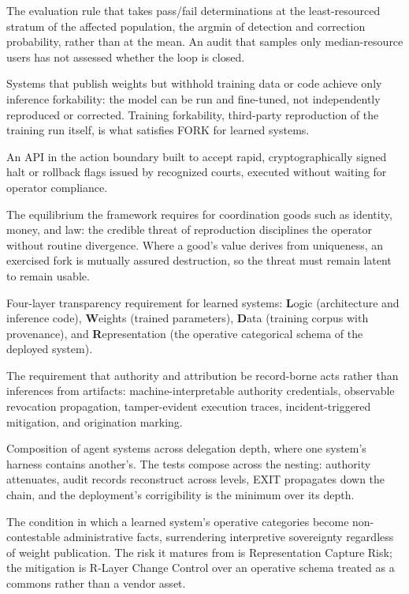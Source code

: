 \begin{description}[style=nextline, leftmargin=1.5em, font=\normalfont\bfseries]
The evaluation rule that takes pass/fail determinations at the
least-resourced stratum of the affected population, the argmin of
detection and correction probability, rather than at the mean. An audit
that samples only median-resource users has not assessed whether the
loop is closed.

Systems that publish weights but withhold training data or code
achieve only inference forkability: the model can be run and
fine-tuned, not independently reproduced or corrected. Training
forkability, third-party reproduction of the training run itself, is
what satisfies FORK for learned systems.

An API in the action boundary built to accept rapid, cryptographically
signed halt or rollback flags issued by recognized courts, executed
without waiting for operator compliance.

The equilibrium the framework requires for coordination goods such as
identity, money, and law: the credible threat of reproduction
disciplines the operator without routine divergence. Where a good's
value derives from uniqueness, an exercised fork is mutually assured
destruction, so the threat must remain latent to remain usable.

Four-layer transparency requirement for learned systems: \textbf{L}ogic
(architecture and inference code), \textbf{W}eights (trained
parameters), \textbf{D}ata (training corpus with provenance), and
\textbf{R}epresentation (the operative categorical schema of the
deployed system).

The requirement that authority and attribution be record-borne acts
rather than inferences from artifacts: machine-interpretable authority
credentials, observable revocation propagation, tamper-evident
execution traces, incident-triggered mitigation, and origination
marking.

Composition of agent systems across delegation depth, where one
system's harness contains another's. The tests compose across the
nesting: authority attenuates, audit records reconstruct across levels,
EXIT propagates down the chain, and the deployment's corrigibility is
the minimum over its depth.

The condition in which a learned system's operative categories become
non-contestable administrative facts, surrendering interpretive
sovereignty regardless of weight publication. The risk it matures from
is Representation Capture Risk; the mitigation is R-Layer Change
Control over an operative schema treated as a commons rather than a
vendor asset.


\end{description}

